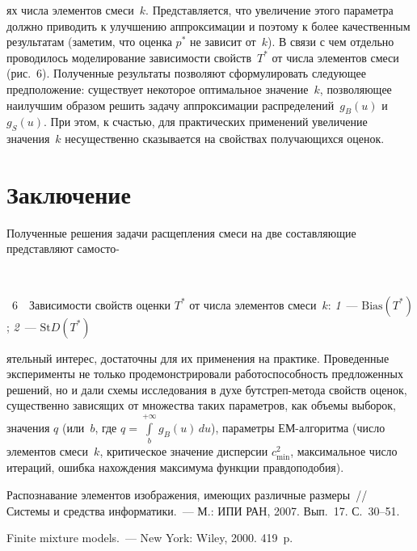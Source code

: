      \begin{multicols}{2}


\noindent 
ях чис\-ла элементов смеси~$k$. Представляется, что увеличение этого параметра должно приводить к улучшению аппроксимации и 
поэтому к более качественным результатам (заметим, что оценка $p^*$ не зависит 
от~$k$). В связи с чем отдельно проводилось моделирование зависимости 
свойств~$T^*$ от числа элементов смеси (рис.~6). Полученные 
результаты позволяют сформулировать следующее предположение: существует 
некоторое оптимальное значение~$k$, позволяющее наилучшим образом решить 
задачу аппроксимации распределений~$g_B(u)$ и~$g_S(u)$. При этом, к счастью, 
для практических применений увеличение значения~$k$ несущественно 
сказывается на свойствах получающихся оценок.


\section{Заключение}

Полученные решения задачи расщепления смеси на две составляющие 
представляют самосто-\linebreak\vspace*{-12pt}

\begin{center}
\vspace*{1pt}
\mbox{%
\epsfxsize=76.855mm
}
\end{center}
\vspace*{2pt}
{{\figurename~6}\ \ \small{Зависимости свойств оценки $T^*$ от числа элементов смеси~$k$: 
\textit{1}~--- $\mathrm{Bias} (T^*)$; \textit{2}~--- $\mathrm{St}D(T^*)$}}
\bigskip
\addtocounter{figure}{1}  

\noindent
ятельный интерес, достаточны для их применения на 
практике. 
Проведенные эксперименты не только продемонстрировали 
работоспособность предложенных решений, но и дали схемы исследования в духе 
бутстреп-метода свойств оценок, сущест\-вен\-но зависящих от множества таких 
параметров, как объемы выборок, значения $q$ (или~$b$, где 
$q=\int\limits_b^{+\infty} g_B(u)\,du$), параметры ЕМ-алгоритма (число элементов 
смеси~$k$, критическое значение дис\-пер\-сии $c^2_{\min}$, максимальное число 
итераций, ошибка нахождения максимума функции правдоподобия).
{%

}
     
{\small\frenchspacing
{%
\begin{thebibliography}{9}
Распознавание элементов изображения, имеющих различные размеры~// Системы 
и средства информатики.~--- М.: ИПИ РАН, 2007. Вып.~17. С.~30--51.

\label{end\stat}

Finite mixture models.~--- New York: Wiley, 2000.  419~p.
\end{thebibliography}
}
}
\end{multicols} 
 
 
 